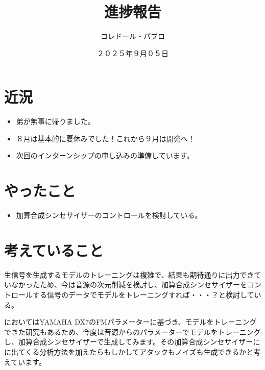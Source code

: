 \documentclass[a4paper, 12pt]{article}
\title{進捗報告}
\author{コレドール・パブロ}
\date{２０２５年９月０５日}
\begin{document}
\maketitle

\section*{近況}
\begin{itemize}
    \item 弟が無事に帰りました。
    \item ８月は基本的に夏休みでした！これから９月は開発へ！
    \item 次回のインターンシップの申し込みの準備しています。
\end{itemize} 

\section*{やったこと}
\begin{itemize}
    \item 加算合成シンセサイザーのコントロールを検討している。
\end{itemize}

\section*{考えていること}

生信号を生成するモデルのトレーニングは複雑で、結果も期待通りに出力できていなかったため、今は音源の次元削減を検討し、加算合成シンセサイザーをコントロールする信号のデータでモデルをトレーニングすれば・・・？と検討している。

\cite{latentSpaceInterpolation}においてはYAMAHA DX7のFMパラメーターに基づき、モデルをトレーニングできた研究もあるため、今度は音源からのパラメーターでモデルをトレーニングし、加算合成シンセサイザーで生成してみます。その加算合成シンセサイザーに\cite{sitranoPiano}に出てくる分析方法を加えたらもしかしてアタックもノイズも生成できるかと考えています。

\end{document}
